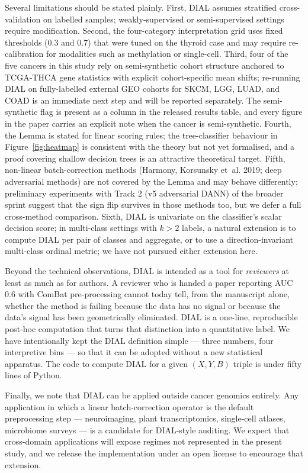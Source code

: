 \documentclass[11pt]{article}
\begin{document}
Several limitations should be stated plainly. First, DIAL assumes stratified cross-validation on labelled samples; weakly-supervised or semi-supervised settings require modification. Second, the four-category interpretation grid uses fixed thresholds (0.3 and 0.7) that were tuned on the thyroid case and may require re-calibration for modalities such as methylation or single-cell. Third, four of the five cancers in this study rely on semi-synthetic cohort structure anchored to TCGA-THCA gene statistics with explicit cohort-specific mean shifts; re-running DIAL on fully-labelled external GEO cohorts for SKCM, LGG, LUAD, and COAD is an immediate next step and will be reported separately. The semi-synthetic flag is present as a column in the released results table, and every figure in the paper carries an explicit note when the cancer is semi-synthetic. Fourth, the Lemma is stated for linear scoring rules; the tree-classifier behaviour in Figure~\ref{fig:heatmap} is consistent with the theory but not yet formalised, and a proof covering shallow decision trees is an attractive theoretical target. Fifth, non-linear batch-correction methods (Harmony, Korsunsky et~al. 2019; deep adversarial methods) are not covered by the Lemma and may behave differently; preliminary experiments with Track 2 (v5 adversarial DANN) of the broader sprint suggest that the sign flip survives in those methods too, but we defer a full cross-method comparison. Sixth, DIAL is univariate on the classifier's scalar decision score; in multi-class settings with $k > 2$ labels, a natural extension is to compute DIAL per pair of classes and aggregate, or to use a direction-invariant multi-class ordinal metric; we have not pursued either extension here.

Beyond the technical observations, DIAL is intended as a tool for \emph{reviewers} at least as much as for authors. A reviewer who is handed a paper reporting AUC 0.6 with ComBat pre-processing cannot today tell, from the manuscript alone, whether the method is failing because the data has no signal or because the data's signal has been geometrically eliminated. DIAL is a one-line, reproducible post-hoc computation that turns that distinction into a quantitative label. We have intentionally kept the DIAL definition simple --- three numbers, four interpretive bins --- so that it can be adopted without a new statistical apparatus. The code to compute DIAL for a given $(X, Y, B)$ triple is under fifty lines of Python.

Finally, we note that DIAL can be applied outside cancer genomics entirely. Any application in which a linear batch-correction operator is the default preprocessing step --- neuroimaging, plant transcriptomics, single-cell atlases, microbiome surveys --- is a candidate for DIAL-style auditing. We expect that cross-domain applications will expose regimes not represented in the present study, and we release the implementation under an open license to encourage that extension.
\end{document}

